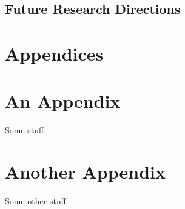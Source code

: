 \documentclass[11pt,twoside]{article}
\numberwithin{Theorem}{section}
\numberwithin{Definition}{section}
\numberwithin{Lemma}{section}
\numberwithin{Algorithm}{section}
\numberwithin{equation}{section}
\begin{document}
\subsection{Future Research Directions}
\clearpage

\printbibliography
\clearpage

\appendix
\section*{Appendices}

\clearpage
\section{An Appendix}
\label{app:one}

Some stuff.
\clearpage

\section{Another Appendix}
\label{app:two}

Some other stuff.
\end{document}
